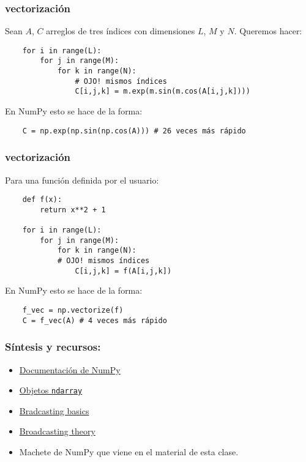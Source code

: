 \documentclass{beamer}
\begin{document}
\begin{frame}[fragile]
    \frametitle{vectorización}
    Sean $A$, $C$ arreglos de tres índices con dimensiones $L$, $M$ y $N$. Queremos hacer:
    \vspace{0.3cm}
    \begin{verbatim}
    for i in range(L):
        for j in range(M):
            for k in range(N):
                # OJO! mismos índices
                C[i,j,k] = m.exp(m.sin(m.cos(A[i,j,k]))) 
    \end{verbatim}
    \vspace{0.3cm}
    En NumPy esto se hace de la forma:
    \vspace{0.3cm}
    \begin{verbatim}
    C = np.exp(np.sin(np.cos(A))) # 26 veces más rápido 
    \end{verbatim}
    \end{frame}

\begin{frame}[fragile]
    \frametitle{vectorización}
    Para una función definida por el usuario:
    \vspace{0.3cm}
    \begin{verbatim}
    def f(x):
        return x**2 + 1
    
    for i in range(L):
        for j in range(M):
            for k in range(N):
            # OJO! mismos índices
                C[i,j,k] = f(A[i,j,k]) 
    \end{verbatim}
    \vspace{0.3cm}
    En NumPy esto se hace de la forma:
    \vspace{0.3cm}
    \begin{verbatim}
    f_vec = np.vectorize(f)
    C = f_vec(A) # 4 veces más rápido
    \end{verbatim}
    \end{frame}

\begin{frame}
\frametitle{Síntesis y recursos:}

\begin{itemize}
\item \href{https://numpy.org/doc/stable/}{Documentación de NumPy}
\item \href{https://numpy.org/doc/stable/reference/arrays.html}{Objetos {\tt ndarray}}
\item \href{https://numpy.org/doc/stable/user/basics.broadcasting.html}{Bradcasting basics}
\item \href{https://numpy.org/doc/stable/user/theory.broadcasting.html}{Broadcasting theory}
\item Machete de NumPy que viene en el material de esta clase.

\end{itemize}
\end{frame}
\end{document}
